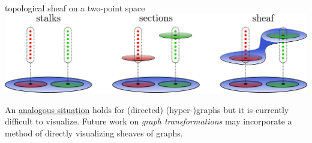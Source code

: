 \begin{frame}
\begin{block}{topological sheaf on a two-point space}
\centering\includegraphics[width=1.0\textwidth]{fig/sheafex.pdf}
\end{block}
\begin{block}{}
An \href{http://en.wikipedia.org/wiki/Talk:Sheaf\_(mathematics)\#Some\_visualization}{analogous situation} holds for (directed) (hyper-)graphs but it is currently difficult to visualize. Future work on {\it graph transformations} may incorporate a method of directly visualizing sheaves of graphs.
\end{block}
\end{frame}

